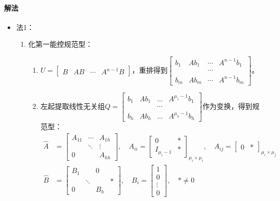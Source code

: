 \documentclass[
12pt, %
a4paper, 
oneside, %
]{scrartcl}
\begin{document}
\paragraph{解法}
\begin{itemize}
\item 法1：
\begin{enumerate}
\item 化第一能控规范型：
\begin{enumerate}
\item $ U = \begin{bmatrix} B & AB & \cdots & A^{n - 1} B \end{bmatrix} $，重排得到$ \begin{bmatrix} b_1 & A b_1 & \cdots & A^{n - 1} b_1 \\ & & \cdots & \\ b_m & A b_m & \cdots & A^{n - 1} b_m \end{bmatrix} $。
\item 左起提取线性无关组$ Q = \begin{bmatrix} b_1 & A b_1 & \dots & A^{\mu_1 - 1} b_1 \\ & & \cdots & \\ b_h & A b_h & \dots & A^{\mu_h - 1} b_h \end{bmatrix} $作为变换，得到规范型：
\begin{align*}
\hat{A} &= \begin{bmatrix} A_{11} & \cdots & A_{1h} \\ & \ddots & \vdots \\ 0 & & A_{hh} \end{bmatrix}, \quad A_{ii} = \begin{bmatrix} 0 & * \\ I_{\mu_i - 1} & * \end{bmatrix}_{\mu_i \times \mu_i}, \quad A_{ij} = \begin{bmatrix} 0 & * \end{bmatrix}_{\mu_i \times \mu_j} \\
\hat{B} &= \begin{bmatrix} B_1 & & 0 & \\ & \ddots & & * \\ 0 & & B_h & \end{bmatrix}, \quad B_i = \begin{bmatrix} 1 \\ 0 \\ \vdots \\ 0 \end{bmatrix}, \quad * \neq 0
\end{align*}

\end{enumerate}
\end{enumerate}
\end{itemize}
\end{document}
